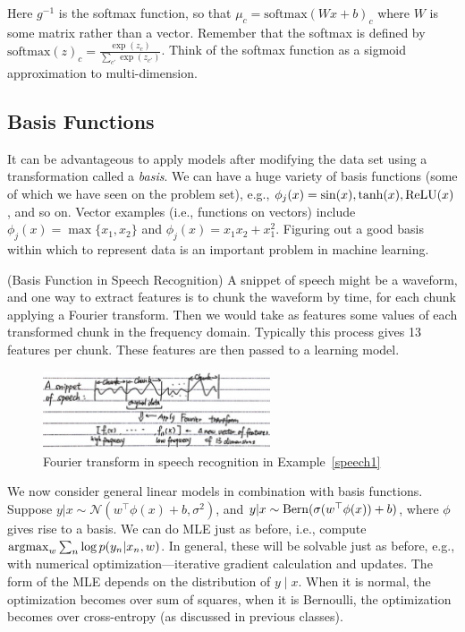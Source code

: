 \documentclass{article}
\begin{document}
\begin{example}
    Here $g^{-1}$ is the softmax function, so that $\mu_c = \text{softmax}(Wx+b)_c$ where $W$ is some matrix rather than a vector.  Remember that the softmax is defined by $\text{softmax}(z)_c = \frac{\exp(z_c)}{\sum_{c'} \exp(z_{c'})}$.  Think of the softmax function as a sigmoid approximation to multi-dimension.
\end{example}

\subsection{Basis Functions}

It can be advantageous to apply models after modifying the data set using a transformation called a \emph{basis}.  We can have a huge variety of basis functions (some of which we have seen on the problem set), e.g., $\phi_j(x) = \sin(x), \tanh(x), \operatorname{ReLU}(x)$, and so on. Vector examples (i.e., functions on vectors) include $\phi_j(x) = \max\{x_1, x_2\}$ and $\phi_j(x) = x_1 x_2 + x_1^2$. Figuring out a good basis within which to represent data is an important problem in machine learning.

\begin{example}
\label{speech1}

  (Basis Function in Speech Recognition) A snippet of speech might be a waveform, and one way to extract features is to chunk the waveform by time, for each chunk applying a Fourier transform. Then we would take as features some values of each transformed chunk in the frequency domain.  Typically this process gives 13 features per chunk.  These features are then passed to a learning model.
    \begin{figure}[!ht]
    \centering
    \includegraphics[width = 0.6\textwidth]{speech1.jpg}
    \caption{Fourier transform in speech recognition in Example~\ref{speech1}}
    \end{figure}
\end{example}

We now consider general linear models in combination with basis functions. Suppose $y | x\sim\mathcal{N}(w^\top\phi(x) + b, \sigma^2)$, and $y | x\sim\operatorname{Bern}(\sigma(w^\top \phi(x)) + b)$, where $\phi$ gives rise to a basis. We can do MLE just as before, i.e., compute $\operatorname{argmax}_w \sum_n \log p(y_n | x_n, w)$. In general, these will be solvable just as before, e.g., with numerical optimization---iterative gradient calculation and updates. The form of the MLE depends on the distribution of $y \mid x$. When it is normal, the optimization becomes over sum of squares, when it is Bernoulli, the optimization becomes over cross-entropy (as discussed in previous classes).
\end{document}
